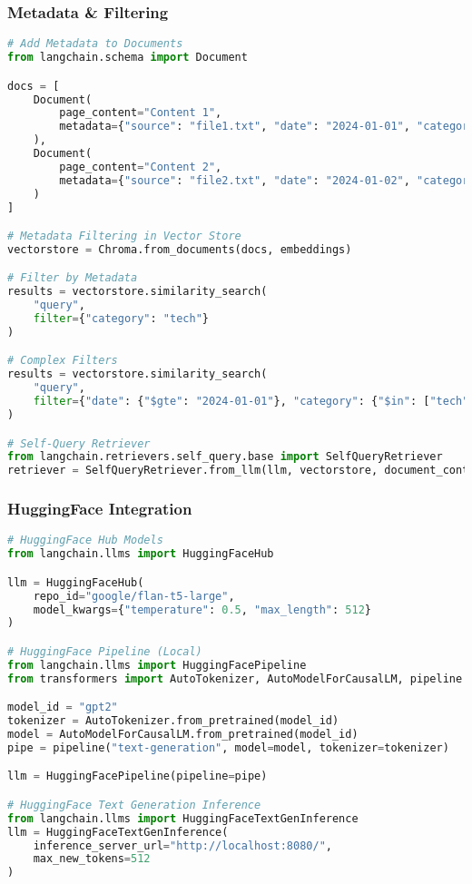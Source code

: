 \begin{frame}[fragile]\frametitle{Metadata \& Filtering}
\begin{lstlisting}[language=python,basicstyle=\tiny]
# Add Metadata to Documents
from langchain.schema import Document

docs = [
    Document(
        page_content="Content 1",
        metadata={"source": "file1.txt", "date": "2024-01-01", "category": "tech"}
    ),
    Document(
        page_content="Content 2", 
        metadata={"source": "file2.txt", "date": "2024-01-02", "category": "science"}
    )
]

# Metadata Filtering in Vector Store
vectorstore = Chroma.from_documents(docs, embeddings)

# Filter by Metadata
results = vectorstore.similarity_search(
    "query",
    filter={"category": "tech"}
)

# Complex Filters
results = vectorstore.similarity_search(
    "query",
    filter={"date": {"$gte": "2024-01-01"}, "category": {"$in": ["tech", "science"]}}
)

# Self-Query Retriever
from langchain.retrievers.self_query.base import SelfQueryRetriever
retriever = SelfQueryRetriever.from_llm(llm, vectorstore, document_contents, metadata_field_info)
\end{lstlisting}
\end{frame}

\begin{frame}[fragile]\frametitle{HuggingFace Integration}
\begin{lstlisting}[language=python,basicstyle=\tiny]
# HuggingFace Hub Models
from langchain.llms import HuggingFaceHub

llm = HuggingFaceHub(
    repo_id="google/flan-t5-large",
    model_kwargs={"temperature": 0.5, "max_length": 512}
)

# HuggingFace Pipeline (Local)
from langchain.llms import HuggingFacePipeline
from transformers import AutoTokenizer, AutoModelForCausalLM, pipeline

model_id = "gpt2"
tokenizer = AutoTokenizer.from_pretrained(model_id)
model = AutoModelForCausalLM.from_pretrained(model_id)
pipe = pipeline("text-generation", model=model, tokenizer=tokenizer)

llm = HuggingFacePipeline(pipeline=pipe)

# HuggingFace Text Generation Inference
from langchain.llms import HuggingFaceTextGenInference
llm = HuggingFaceTextGenInference(
    inference_server_url="http://localhost:8080/",
    max_new_tokens=512
)
\end{lstlisting}
\end{frame}

